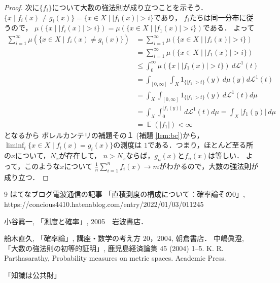 \documentclass[leqno, a4paper, 12pt]{jsarticle}
\DeclareMathOperator{\mean}{\mathbb{E}}
\begin{document}
\begin{proof}
次に$\{f_i\}$について大数の強法則が成り立つことを示そう．
$\{x\mid f_{i}(x)\neq g_{i}(x)\}=
\{x\in X\mid |f_i(x)|>i\}$であり，
$f_{i}$たちは同一分布に従うので，
$\mu(\{x\mid |f_{i}(x)|>i\})=\mu(\{x\in X\mid |f_{1}(x)|>i\})$である．
よって
\begin{align*}
\sum_{i=1}^{\infty}\mu(\{x\in X\mid f_{i}(x)\neq g_{i}(x)\})
&=
\sum_{i=1}^{\infty}\mu(\{x\in X\mid |f_{i}(x)|>i\})\\
&=
\sum_{i=1}^{\infty}\mu(\{x\in X\mid |f_{1}(x)|>i\})\\
&\le 
\int_{0}^{\infty}\mu(\{x\mid |f_{1}(x)|>t\})\ d\mathcal{L}^1(t)\\
&=
\int_{[0, \infty]}\int_{X}1_{\{|f_1|>t\}}(y)\ d\mu(y)d\mathcal{L}^1(t)\\
&=\int_X\int_{[0, \infty]}1_{\{|f_1|>t\}}(y)\ d\mathcal{L}^1(t)d\mu\\
&=
\int_X\int_{0}^{|f_1(y)|}\ d\mathcal{L}^{1}(t) d\mu=
\int_X|f_1(y)|\ d\mu\\
&=
\mean(|f_1|)<\infty
\end{align*}
となるから
ボレルカンテリの補題その１
(補題 \ref{lem:bc})から，
$\liminf_i \{x\in X\mid f_{i}(x)=g_{i}(x)\}$の測度は
$1$である．つまり，ほとんど至る所の$x$について，$N_x$が存在して，
$n>N_x$ならば，$g_n(x)$と$f_n(x)$は等しい．
よって，このような$x$について
$\frac{1}{n}\sum_{i=1}^{n}f_{i}(x)\to m$がわかるので，大数の強法則が成り立つ．
\end{proof}



	
\begin{thebibliography}{9}
はてなブログ電波通信の記事
「直積測度の構成について：確率論その0」, 
https://concious4410.hatenablog.com/entry/2022/01/03/011245

小谷眞一, 「測度と確率」, 2005　岩波書店．

船木直久, 「確率論」, 
講座・数学の考え方 20，2004, 朝倉書店．
中嶋眞澄, 「大数の強法則の初等的証明」, 鹿児島経済論集 45 (2004) 1--5.
K. R. Parthasarathy,  Probability measures on metric spaces. 
Academic Press. 
\end{thebibliography}

「知識は公共財」


			
\end{document}
